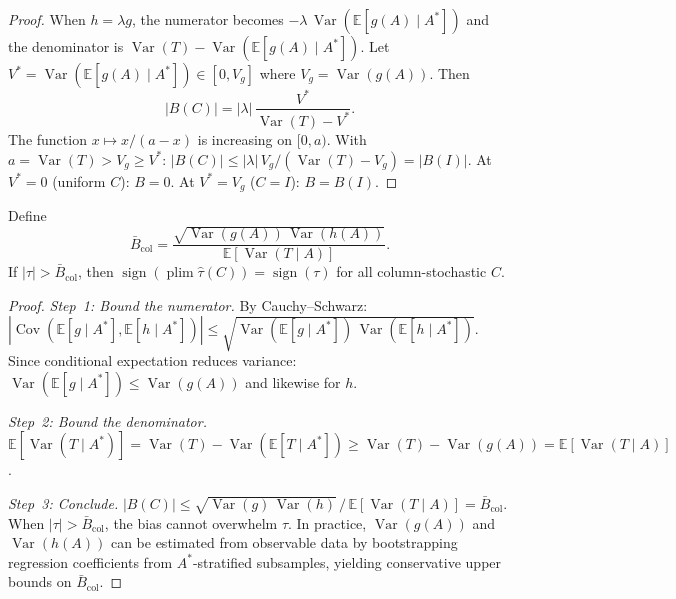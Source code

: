 \begin{proof}
When $h=\lambda g$, the numerator becomes $-\lambda\,\operatorname{Var}(\mathbb{E}[g(A)\mid A^*])$ and the denominator is $\operatorname{Var}(T)-\operatorname{Var}(\mathbb{E}[g(A)\mid A^*])$.
Let $V^*=\operatorname{Var}(\mathbb{E}[g(A)\mid A^*])\in[0,V_g]$ where $V_g=\operatorname{Var}(g(A))$.
Then
\[
  |B(C)| = |\lambda|\,\frac{V^*}{\operatorname{Var}(T)-V^*}.
\]
The function $x\mapsto x/(a-x)$ is increasing on $[0,a)$.
With $a=\operatorname{Var}(T)>V_g\geq V^*$:
$|B(C)|\leq|\lambda|\,V_g/(\operatorname{Var}(T)-V_g)=|B(I)|$.
At $V^*{=}0$ (uniform $C$): $B{=}0$.  At $V^*{=}V_g$ ($C{=}I$): $B{=}B(I)$.
\end{proof}

\begin{proposition}
\label{prop:col_gen}
Define
\begin{equation}
  \bar{B}_{\mathrm{col}} = \frac{\sqrt{\operatorname{Var}(g(A))\,\operatorname{Var}(h(A))}}{\mathbb{E}[\operatorname{Var}(T\mid A)]}.
  \label{eq:bbar_col}
\end{equation}
If $|\tau|>\bar{B}_{\mathrm{col}}$, then $\operatorname{sign}(\operatorname{plim}\hat\tau(C))=\operatorname{sign}(\tau)$ for all column-stochastic $C$.
\end{proposition}

\begin{proof}
\emph{Step~1: Bound the numerator.}
By Cauchy--Schwarz:
$|\operatorname{Cov}(\mathbb{E}[g\mid A^*],\mathbb{E}[h\mid A^*])|\leq\sqrt{\operatorname{Var}(\mathbb{E}[g\mid A^*])\,\operatorname{Var}(\mathbb{E}[h\mid A^*])}$.
Since conditional expectation reduces variance: $\operatorname{Var}(\mathbb{E}[g\mid A^*])\leq\operatorname{Var}(g(A))$ and likewise for $h$.

\emph{Step~2: Bound the denominator.}
$\mathbb{E}[\operatorname{Var}(T\mid A^*)]=\operatorname{Var}(T)-\operatorname{Var}(\mathbb{E}[T\mid A^*])\geq\operatorname{Var}(T)-\operatorname{Var}(g(A))=\mathbb{E}[\operatorname{Var}(T\mid A)]$.

\emph{Step~3: Conclude.}
$|B(C)|\leq\sqrt{\operatorname{Var}(g)\,\operatorname{Var}(h)}\,/\,\mathbb{E}[\operatorname{Var}(T\mid A)]=\bar{B}_{\mathrm{col}}$.
When $|\tau|>\bar{B}_{\mathrm{col}}$, the bias cannot overwhelm $\tau$. In practice, $\operatorname{Var}(g(A))$ and $\operatorname{Var}(h(A))$ can be estimated from observable data by bootstrapping regression coefficients from $A^*$-stratified subsamples, yielding conservative upper bounds on $\bar{B}_{\mathrm{col}}$.
\end{proof}

